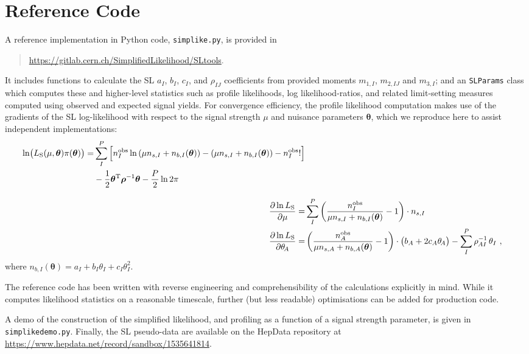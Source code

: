 \documentclass[11pt]{article}
\begin{document}
\section{Reference Code}
\label{app:reference_code}

A reference implementation in Python code, {\tt simplike.py}, is provided in
\begin{quote}
  \url{https://gitlab.cern.ch/SimplifiedLikelihood/SLtools}. 
\end{quote}
It includes functions to
calculate the SL $a_I$, $b_I$, $c_I$, and $\rho_{IJ}$ coefficients from provided
moments $m_{1,I}$, $m_{2,IJ}$ and $m_{3,I}$; and an \texttt{SLParams} class
which computes these and higher-level statistics such as profile likelihoods,
log likelihood-ratios, and related limit-setting measures computed using
observed and expected signal yields. For convergence efficiency, the profile
likelihood computation makes use of the gradients of the SL log-likelihood with
respect to the signal strength $\mu$ and nuisance parameters $\bm{\theta}$,
which we reproduce here to assist independent implementations:
%
\begin{align}
  \begin{split}
    \ln\! \big( L_{\rm{S}}(\mu,\bm{\theta} )\pi(\bm{\theta}) \big) =&
    \sum_I^P \Big[ n^{\rm{obs}}_{I} \ln \left(\mu n_{s,I} + n_{b,I}({\bm \theta}) \right) - \left( \mu n_{s,I} + n_{b,I}({\bm \theta}) \right) - n^{\rm{obs}}_{I}! \Big]\\
    &- \frac{1}{2} \bm{\theta}^\mathrm{T} \bm{\rho}^{-1} \bm{\theta} - \frac{P}{2} \ln 2\pi
  \end{split}\\[2ex]
  \frac{\partial\ln L_{\rm{S}}}{\partial\mu} =& \sum_I^P \left( \frac{n^{\rm{obs}}_I}{\mu n_{s,I} + n_{b,I}(\bm{\theta})} - 1 \right) \cdot n_{s,I} \\
  \frac{\partial\ln L_{\rm{S}}}{\partial\theta_{\!A}} =& \left( \frac{n^{\rm{obs}}_A}{\mu n_{s,A} + n_{b,A}({\bm \theta}) } - 1 \right) \cdot \big( b_A + 2 c_A \theta_{\!A} \big) - \sum_I^P \rho_{\mspace{-1mu}AI}^{-1} \, \theta_I ~,
\label{eq:SL_LHC_refcode}
\end{align}
%
where $n_{b,I}({\bm\theta}) = a_{I} + b_{I}\theta_{I} + c_{I}\theta_{I}^{2}$.

The reference code has been written with reverse engineering and
comprehensibility of the calculations explicitly in mind. While it computes
likelihood statistics on a reasonable timescale, further (but less readable)
optimisations can be added for production code.

A demo of the construction of the simplified likelihood, and profiling as a function of a signal strength parameter, is given in {\tt simplikedemo.py}.
Finally, the SL pseudo-data are available on the HepData repository at \url{https://www.hepdata.net/record/sandbox/1535641814}.




\end{document}
